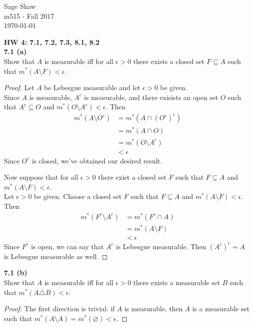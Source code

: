 \documentclass[12pt]{article}
\newcommand{\problem}[1]{\hspace{-4 ex} \large \textbf{#1}\\}
\let\emptyset\varnothing
\begin{document}
	\thispagestyle{empty}
	
	\begin{flushright}
		Sage Shaw \\
		m515 - Fall 2017 \\
		\today
	\end{flushright}
	
\large{\textbf{HW 4: 7.1, 7.2, 7.3, 8.1, 8.2}}\\

\problem{7.1 (a)} Show that $A$ is measurable iff for all $\epsilon>0$ there exists a closed set $F\subseteq A$ such that $m^*(A\setminus F)<\epsilon$.

	\begin{proof}
		Let $A$ be Lebesgue measurable and let $\epsilon > 0$ be given. \\
		Since $A$ is measurable, $A^c$ is measurable, and there exisists an open set $O$ such that $A^c \subseteq O$ and $m^*(O \setminus A^c) < \epsilon$. Then 
		\begin{align*}
			m^*(A \setminus O^c) & = m^*(A \cap (O^c)^c) \\
			& = m^*(A \cap O) \\
			& = m^*(O \setminus A^c) \\
			& < \epsilon
		\end{align*}
		Since $O^c$ is closed, we've obtained our desired result. \bigbreak
		
		Now suppose that for all $\epsilon > 0$ there exist a closed set $F$ such that $F \subseteq A$ and $m^*(A \setminus F) < \epsilon$. \\
		Let $\epsilon >0$ be given. Choose a closed set $F$ such that $F \subseteq A$ and $m^*(A \setminus F) < \epsilon$. Then
		\begin{align*}
			m^*(F^c \setminus A^c) & = m^*(F^c \cap A) \\
			& = m^*(A \setminus F) \\
			& < \epsilon
		\end{align*}
		Since $F^c$ is open, we can say that $A^c$ is Lebesgue measurable. Then $(A^c)^c = A$ is Lebesgue measurable as well.		
	\end{proof}

\problem{7.1 (b)} Show that $A$ is measurable iff for all $\epsilon>0$ there exists a measurable set $B$ such that $m^*(A\triangle B)<\epsilon$.

	\begin{proof}
		The first direction is trivial: if $A$ is measurable, then $A$ is a measurable set such that $m^*(A \setminus A) = m^*(\emptyset) < \epsilon$.
	\end{proof}
\end{document}
